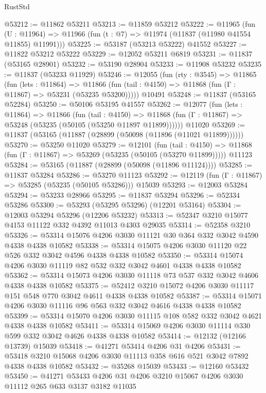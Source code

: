 \begin{lexlean}{RustStd}
\begin{coremodule}
@53212 := @11862 @53211
@53213 := @11859 @53212
@53222 := @11965
    (fun (U : @11964) => @11966 (fun (t : @7) => @11974 (@11837 (@11980 @41554 @11855) @11991)))
@53225 := @53187 (@53213 @53222) @41552
@53227 := @11822 @53212 @53222
@53229 := @12052 @53211 @6819
@53231 := @11837 (@53165 @28901)
@53232 := @53190 @28904
@53233 := @11908 @53232
@53235 := @11837 (@53233 @11929)
@53246 := @12055
    (fun (rty : @3545) =>
    @11865
      (fun (lets : @11864) =>
      @11866 (fun (tail : @4150) => @11868 (fun (Γ : @11867) => @53231 (@53235 @53200)))))
    @10491
@53248 := @11837 (@53165 @52284)
@53250 := @50106 @53195 @41557
@53262 := @12077
    (fun (lets : @11864) =>
    @11866
      (fun (tail : @4150) =>
      @11868 (fun (Γ : @11867) => @53248 (@53235 (@50105 (@53250 @11897 @11899))))))
    @11020
@53269 := @11837 (@53165 (@11887 (@28899 (@50098 (@11896 (@11021 @11899))))))
@53270 := @53250 @11020
@53279 := @12101
    (fun (tail : @4150) => @11868 (fun (Γ : @11867) => @53269 (@53235 (@50105 (@53270 @11899)))))
    @11123
@53284 := @53165 (@11887 (@28899 (@50098 (@11896 @11124))))
@53285 := @11837 @53284
@53286 := @53270 @11123
@53292 := @12119 (fun (Γ : @11867) => @53285 (@53235 (@50105 @53286))) @15039
@53293 := @12003 @53284
@53294 := @53233 @28966
@53295 := @11837 @53294
@53296 := @52334 @53286
@53300 := @53293 (@53295 @53296) (@12201 @53164)
@53304 := @12003 @53294 @53296 (@12206 @53232)
@53313 := @52347 @3210 @15077 @4153 @11122 @332 @4392 @11013 @4303 @29035
@53314 := @52358 @3210
@53326 := @53314 @15076 @4206 @3030 @11121 @30 @364 @332 @3042 @4590 @4338 @4338 @10582
@53338 := @53314 @15075 @4206 @3030 @11120 @22 @526 @332 @3042 @4596 @4338 @4338 @10582
@53350 := @53314 @15074 @4206 @3030 @11119 @82 @532 @332 @3042 @4601 @4338 @4338 @10582
@53362 := @53314 @15073 @4206 @3030 @11118 @73 @537 @332 @3042 @4606 @4338 @4338 @10582
@53375 := @52412 @3210 @15072 @4206 @3030 @11117 @151 @548 @770 @3042 @4611 @4338 @4338 @10582
@53387 := @53314 @15071 @4206 @3030 @11116 @96 @563 @332 @3042 @4616 @4338 @4338 @10582
@53399 := @53314 @15070 @4206 @3030 @11115 @108 @582 @332 @3042 @4621 @4338 @4338 @10582
@53411 := @53314 @15069 @4206 @3030 @11114 @330 @599 @332 @3042 @4626 @4338 @4338 @10582
@53414 := @12132 (@12166 @13739) @15039
@53418 := @41271 @53414 @4206 @31 @4206
@53431 := @53418 @3210 @15068 @4206 @3030 @11113 @358 @616 @521 @3042 @7892 @4338 @4338 @10582
@53432 := @35268 @15039
@53433 := @12160 @53432
@53450 := @41271
    @53433
    @4206
    @31
    @4206
    @3210
    @15067
    @4206
    @3030
    @11112
    @265
    @633
    @3137
    @3182
    @11035

\end{coremodule}
\end{lexlean}
